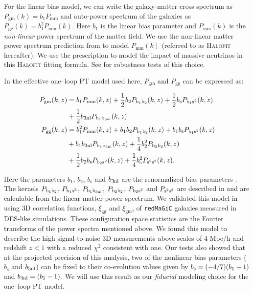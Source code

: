 \documentclass[aps, prd,twocolumn,superscriptaddress,nofootinbib,preprintnumbers]{revtex4-1}
\newcommand{\xigg}{\ensuremath{\xi_{\mathrm{gg}}} }
\newcommand{\xigm}{\ensuremath{\xi_{\mathrm{gm}}} }
\newcommand{\redmagic}{\texttt{redMaGiC} }
\newcommand{\red}[1]{\textcolor{red}{#1}}
\newcommand{\gary}[1]{\textcolor{red}{#1}}
\begin{document}
For the linear bias model, we can write the galaxy-matter cross spectrum as $P_{\mathrm{gm}}(k) = b_1 P_{\mathrm{mm}}$ and auto-power spectrum of the galaxies as $P_{\mathrm{gg}}(k) = b_1^2 P_{\mathrm{mm}}(k)$. Here $b_1$ is the linear bias parameter and $P_{\mathrm{mm}}(k)$ is the \textit{non-linear} power spectrum of the matter field. We use the non-linear matter power spectrum prediction from \citet{Takahashi:2012em} to model $P_{\mathrm{mm}}(k)$ (referred to as \textsc{Halofit} hereafter). We use the  \citet{Bird_halofit} prescription to model the impact of massive neutrinos in this \textsc{Halofit} fitting formula. See \cite{y3-generalmethods} for robustness tests of this choice.  


In the effective one--loop PT model used here, $P_{\mathrm{gm}}$ and $P_{\mathrm{gg}}$ can be expressed as:
\begin{linenomath*}
\begin{align}\label{eq:P_gg_gm}
    P_{\mathrm{gm}}(k, z) &= b_1 P_{\mathrm{mm}}(k, z) +  \frac{1}{2} b_2 P_{\rm b_1 b_2}(k, z) + \frac{1}{2} b_{\mathrm{s}} P_{\rm b_1 s^2}(k, z) \nonumber  \\
    & + \frac{1}{2} b_{\rm 3nl}P_{\rm b_1 b_{\rm 3nl}}(k, z) \\
    P_{\mathrm{gg}}(k, z) &= b_1^2 P_{\mathrm{mm}}(k, z) + b_1 b_2 P_{\rm b_1 b_2}(k, z) + b_1 b_{\mathrm{s}}P_{\rm b_1 s^2}(k, z) \nonumber \\ 
    & + b_1b_{\rm 3nl} P_{\rm b_1 b_{\rm 3nl} }(k, z) + \frac{1}{4}b_2^2 P_{\rm b_2 b_2}(k, z)  \nonumber \\
    &  + \frac{1}{2} b_2 b_{\mathrm{s}}P_{\rm b_2 s^2}(k, z) + \frac{1}{4} b^2_{\mathrm{s}} P_{\rm s^2 s^2}(k, z).  
\end{align}
\end{linenomath*}
Here the parameters $ b_1 $, $ b_2 $, $ b_{\mathrm{s}} $ and $ b_{\rm 3nl} $ are the renormalized bias parameters \citep{McDonald2009}. The kernels $P_{\rm b_1 b_2}$, $P_{\rm b_1 s^2}$, $P_{\rm b_1 b_{\rm 3nl}}$, $P_{\rm b_2 b_2}$, $P_{\rm b_2 s^2}$ and $P_{\rm s^2 s^2}$ are described in \cite{Saito2014a} and are calculable from the linear matter power spectrum. 
We validated this model in \cite{p2020perturbation} using 3D correlation functions, $\xigg$ and $\xigm$, of \redmagic galaxies measured in DES-like simulations. These configuration space statistics are the Fourier transforms of the power spectra mentioned above. We found this model to describe the high signal-to-noise 3D measurements above scales of 4 Mpc/h and redshift $z < 1$ with a reduced $\chi^2$ consistent with one. Our tests also showed that at the projected precision of this analysis, two of the nonlinear bias parameters ($ b_{\mathrm{s}} $ and $ b_{\rm 3nl} $) can be fixed to their co-evolution values given by $b_{\rm s} = (-4/7) (b_1 - 1)$ and $b_{\rm 3nl} = (b_1 - 1)$. We will use this result as our \textit{fiducial} modeling choice for the one--loop PT model. 
\end{document}
